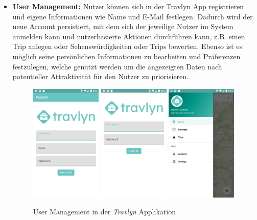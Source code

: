 \begin{itemize}
	\item \textbf{User Management:} Nutzer können sich in der Travlyn App registrieren und eigene Informationen wie Name und E-Mail festlegen. Dadurch wird der neue Account persistiert, mit dem sich der jeweilige Nutzer im System anmelden kann und nutzerbasierte Aktionen durchführen kann, z.B. einen Trip anlegen oder Sehenswürdigkeiten oder Trips bewerten. Ebenso ist es möglich seine persönlichen Informationen zu bearbeiten und Präferenzen festzulegen, welche genutzt werden um die angezeigten Daten nach potentieller Attraktivität für den Nutzer zu priorisieren.
	
	
	\begin{figure}[ht!]
		\includegraphics[width=0.32\textwidth]{images/travlyn-screenshot-register.png}
		\includegraphics[width=0.32\textwidth]{images/travlyn-screenshot-login.png}
		\includegraphics[width=0.32\textwidth]{images/travlyn-screenshot-side-navigation.png}
		\caption{User Management in der \textit{Travlyn} Applikation}
		\label{fig:ui_usermanagement}
	\end{figure}


\end{itemize}
